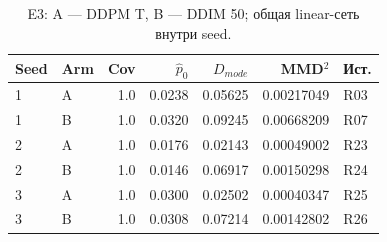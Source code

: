 \begin{table}[H]\centering\small
\setlength{\tabcolsep}{4pt}
\caption{E3: A --- DDPM T, B --- DDIM 50; общая linear-сеть внутри seed.}\label{tab:e3}
\begin{tabular}{llrrrrl}
\toprule
Seed & Arm & Cov & $\hat p_0$ & $D_{mode}$ & MMD$^2$ & Ист. \\
\midrule
1 & A & 1.0 & 0.0238 & 0.05625 & 0.00217049 & R03 \\
1 & B & 1.0 & 0.0320 & 0.09245 & 0.00668209 & R07 \\
2 & A & 1.0 & 0.0176 & 0.02143 & 0.00049002 & R23 \\
2 & B & 1.0 & 0.0146 & 0.06917 & 0.00150298 & R24 \\
3 & A & 1.0 & 0.0300 & 0.02502 & 0.00040347 & R25 \\
3 & B & 1.0 & 0.0308 & 0.07214 & 0.00142802 & R26 \\
\bottomrule
\end{tabular}
\end{table}
